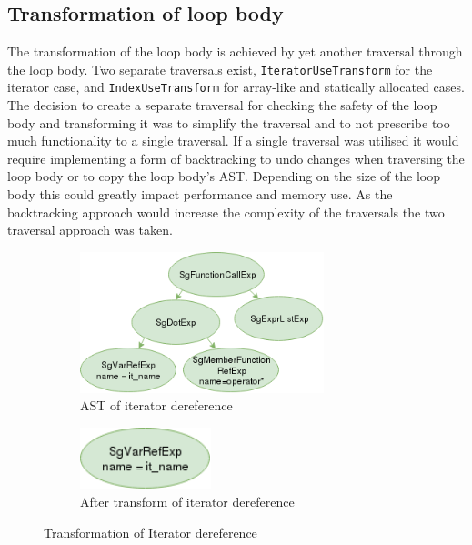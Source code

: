 \documentclass[bsc,frontabs,singlespacing,twoside,parskip,deptreport]{infthesis}
\begin{document}
\subsection{Transformation of loop body}

The transformation of the loop body is achieved by yet another traversal through the loop body. Two separate traversals exist, \texttt{IteratorUseTransform} for the iterator case, and \texttt{IndexUseTransform} for array-like and statically allocated cases. The decision to create a separate traversal for checking the safety of the loop body and transforming it was to simplify the traversal and to not prescribe too much functionality to a single traversal. If a single traversal was utilised it would require implementing a form of backtracking to undo changes when traversing the loop body or to copy the loop body's AST. Depending on the size of the loop body this could greatly impact performance and memory use. As the backtracking approach would increase the complexity of the traversals the two traversal approach was taken.

\begin{figure}[H]
    \begin{subfigure}[b]{0.5\textwidth}
        \centering
            \includegraphics[height=4.1cm]{images/iterator-deref-replace-ast.png}
        \caption{AST of iterator dereference}
        \label{fig:iter-AST-Trans-deref-before}
    \end{subfigure}
    \hfill
    \begin{subfigure}[b]{0.5\textwidth}
        \centering
            \includegraphics[width=0.42\textwidth]{images/single-varRef-node.png}
        \caption{After transform of iterator dereference}
        \label{fig:iter-AST-Trans-deref-after}
    \end{subfigure}
    \vspace{-0.5cm}
    \caption{Transformation of Iterator dereference}
    \label{fig:iter-deref-use-trans}
\end{figure}
\end{document}
